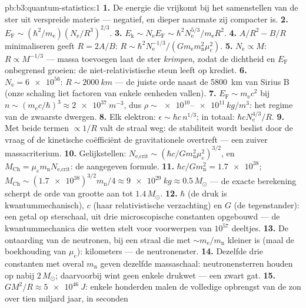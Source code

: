 \begin{solution}{pb:b3:quantum-statistics:1}
\textbf{1.} De energie die vrijkomt bij het samenstellen van de ster uit
verspreide materie --- negatief, en dieper naarmate zij compacter is.
\textbf{2.} $E_{\text{F}} \sim (\hbar^2/m_{\text{e}})
(N_{\text{e}}/R^3)^{2/3}$.
\textbf{3.} $E_{\text{k}} \sim N_{\text{e}}E_{\text{F}} \sim
\hbar^2N_{\text{e}}^{5/3}/m_{\text{e}}R^2$.
\textbf{4.} $A/R^2 - B/R$ minimaliseren geeft $R = 2A/B$: $R \sim
\hbar^2N_{\text{e}}^{-1/3}/(Gm_{\text{e}}m_{\text{n}}^2\mu_e^2)$.
\textbf{5.} $N_{\text{e}} \propto M$: $R \propto M^{-1/3}$ --- massa
toevoegen laat de ster \emph{krimpen}, zodat de dichtheid en
$E_{\text{F}}$ onbegrensd groeien: de niet-relativistische steun leeft op
krediet.
\textbf{6.} $N_{\text{e}} = \num{6e56}$: $R \sim \qty{2000}{km}$ --- de
juiste orde naast de \qty{5800}{km} van Sirius B (onze schaling liet
factoren van enkele eenheden vallen).
\textbf{7.} $E_{\text{F}} \sim m_{\text{e}}c^2$ bij $n \sim
(m_{\text{e}}c/\hbar)^3 \approx \qty{2e37}{m^{-3}}$, dus $\rho
\sim \num{e10}$--$\num{e11}\,\unit{kg/m^3}$: het regime van de zwaarste
dwergen.
\textbf{8.} Elk elektron: $\epsilon \sim \hbar c\,n^{1/3}$; in totaal:
$\hbar cN_{\text{e}}^{4/3}/R$.
\textbf{9.} Met beide termen $\propto 1/R$ valt de straal weg: de
stabiliteit wordt beslist door de vraag of de kinetische coëfficiënt de
gravitationele overtreft --- een zuiver massacriterium.
\textbf{10.} Gelijkstellen: $N_{\text{e,crit}} \sim (\hbar c/
Gm_{\text{n}}^2\mu_e^2)^{3/2}$, en $M_{\text{Ch}} =
\mu_em_{\text{n}}N_{\text{e,crit}}$: de aangegeven formule.
\textbf{11.} $\hbar c/Gm_{\text{n}}^2 = \num{1.7e38}$;
$M_{\text{Ch}} \sim (\num{1.7e38})^{3/2}m_{\text{n}}/4 \approx
\qty{9e29}{kg} \approx 0.5\,M_\odot$ --- de exacte berekening scherpt de
orde van grootte aan tot $1.4\,M_\odot$.
\textbf{12.} $\hbar$ (de druk is kwantummechanisch), $c$ (haar
relativistische verzachting) en $G$ (de tegenstander): een getal op
sterschaal, uit drie microscopische constanten opgebouwd --- de
kwantummechanica die wetten stelt voor voorwerpen van $10^{57}$ deeltjes.
\textbf{13.} De ontaarding van de neutronen, bij een straal die met
$\sim m_{\text{e}}/m_{\text{n}}$ kleiner is (maal de boekhouding van
$\mu_e$): kilometers --- de neutronenster.
\textbf{14.} Dezelfde drie constanten met overal $m_{\text{n}}$ geven
dezelfde massaschaal: neutronensterren houden op nabij $2\,M_\odot$;
daarvoorbij wint geen enkele drukwet --- een zwart gat.
\textbf{15.} $GM^2/R \approx \qty{5e46}{J}$: enkele honderden malen de
volledige opbrengst van de zon over tien miljard jaar, in seconden

\end{solution}
